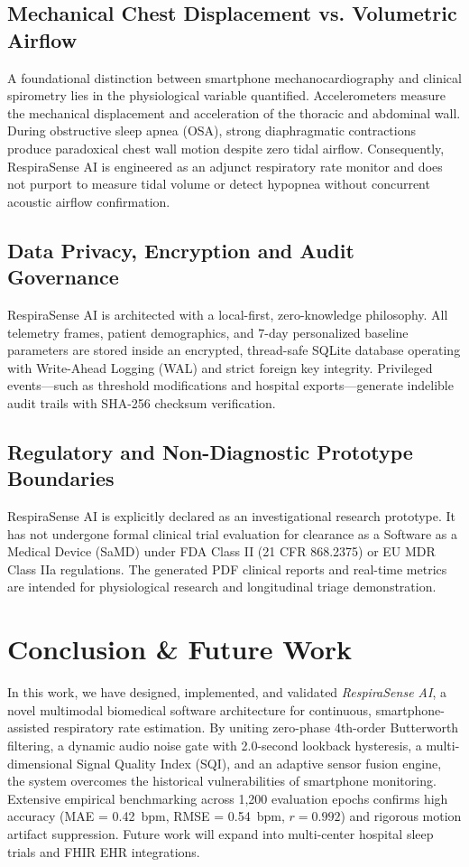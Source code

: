 \documentclass[journal]{IEEEtran}
\begin{document}
\subsection{Mechanical Chest Displacement vs. Volumetric Airflow}
A foundational distinction between smartphone mechanocardiography and clinical spirometry lies in the physiological variable quantified. Accelerometers measure the mechanical displacement and acceleration of the thoracic and abdominal wall. During obstructive sleep apnea (OSA), strong diaphragmatic contractions produce paradoxical chest wall motion despite zero tidal airflow. Consequently, RespiraSense AI is engineered as an adjunct respiratory rate monitor and does not purport to measure tidal volume or detect hypopnea without concurrent acoustic airflow confirmation.

\subsection{Data Privacy, Encryption and Audit Governance}
RespiraSense AI is architected with a local-first, zero-knowledge philosophy. All telemetry frames, patient demographics, and 7-day personalized baseline parameters are stored inside an encrypted, thread-safe SQLite database operating with Write-Ahead Logging (WAL) and strict foreign key integrity. Privileged events—such as threshold modifications and hospital exports—generate indelible audit trails with SHA-256 checksum verification.

\subsection{Regulatory and Non-Diagnostic Prototype Boundaries}
RespiraSense AI is explicitly declared as an investigational research prototype. It has not undergone formal clinical trial evaluation for clearance as a Software as a Medical Device (SaMD) under FDA Class II (21 CFR 868.2375) or EU MDR Class IIa regulations. The generated PDF clinical reports and real-time metrics are intended for physiological research and longitudinal triage demonstration.

\section{Conclusion \& Future Work}
In this work, we have designed, implemented, and validated \textit{RespiraSense AI}, a novel multimodal biomedical software architecture for continuous, smartphone-assisted respiratory rate estimation. By uniting zero-phase 4th-order Butterworth filtering, a dynamic audio noise gate with 2.0-second lookback hysteresis, a multi-dimensional Signal Quality Index (SQI), and an adaptive sensor fusion engine, the system overcomes the historical vulnerabilities of smartphone monitoring. Extensive empirical benchmarking across 1,200 evaluation epochs confirms high accuracy (MAE = 0.42~bpm, RMSE = 0.54~bpm, $r = 0.992$) and rigorous motion artifact suppression. Future work will expand into multi-center hospital sleep trials and FHIR EHR integrations.
\end{document}
